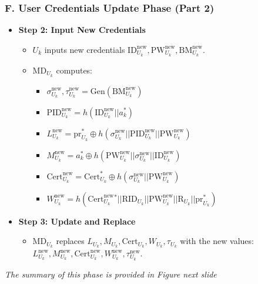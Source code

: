 \documentclass[9pt,handout]{beamer}
\begin{document}
\begin{frame}
    \frametitle{F. User Credentials Update Phase (Part 2)}

    \begin{itemize}
        
        \item \textbf{Step 2: Input New Credentials}
        \begin{itemize}
            \item \( U_k \) inputs new credentials \( \text{ID}_{U_k}^{\text{new}}, \text{PW}_{U_k}^{\text{new}}, \text{BM}_{U_k}^{\text{new}} \).
            \item \( \text{MD}_{U_k} \) computes:
            \begin{itemize}
                \item \( \sigma_{U_k}^{\text{new}}, \tau_{U_k}^{\text{new}} = \text{Gen}(\text{BM}_{U_k}^{\text{new}}) \)
                \item \( \text{PID}_{U_k}^{\text{new}} = h(\text{ID}_{U_k}^{\text{new}} ||  a^*_k) \)
                \item \( L_{U_k}^{\text{new}} = \text{pr}_{U_k}^* \oplus h(\sigma_{U_k}^{\text{new}} || \text{PID}_{U_k}^{\text{new}} || \text{PW}_{U_k}^{\text{new}} ) \)
                \item \( M_{U_k}^{\text{new}} = a^*_k \oplus h(\text{PW}_{U_k}^{\text{new}} || \sigma_{U_k}^{\text{new}} || \text{ID}_{U_k}^{\text{new}}) \)
                
                \item \( \text{Cert}_{U_k}^{\text{new}} = \text{Cert}_{U_k}^* \oplus h(\sigma_{U_k}^{\text{new}} || \text{PW}_{U_k}^{\text{new}}) \)
                \item \( W_{U_k}^{\text{new}} = h(\text{Cert}_{U_k}^{\text{new}}^* || \text{RID}_{U_k} || \text{PW}_{U_k}^{\text{new}} || \text{R}_{U_k} || \text{pr}_{U_k}^*) \)
            \end{itemize}
        \end{itemize}
        
        \item \textbf{Step 3: Update and Replace}
        \begin{itemize}
            \item \( \text{MD}_{U_k} \) replaces \( L_{U_k}, M_{U_k}, \text{Cert}_{U_k}, W_{U_k}, \tau_{U_k} \) with the new values: \( L_{U_k}^{\text{new}}, M_{U_k}^{\text{new}}, \text{Cert}_{U_k}^{\text{new}}, W_{U_k}^{\text{new}}, \tau_{U_k}^{\text{new}} \).
        \end{itemize}
    \end{itemize}
    
    \vspace{0.5em}
    \textit{The summary of this phase is provided in Figure next slide}
\end{frame}
\end{document}
